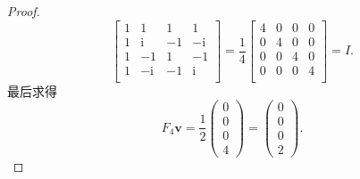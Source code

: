 \begin{proof}
\[\begin{bmatrix}
            1 & 1 & 1 & 1 \\
            1 & \mathrm{i} & -1 & -\mathrm{i} \\
            1 & -1 & 1 & -1 \\
            1 & -\mathrm{i} & -1 & \mathrm{i} \\
         \end{bmatrix} = \frac{1}{4} \begin{bmatrix}
            4 & 0 & 0 & 0 \\
            0 & 4 & 0 & 0 \\
            0 & 0 & 4 & 0 \\
            0 & 0 & 0 & 4 \\
         \end{bmatrix} = I.
    \]
    最后求得
    \[
        F_4\bm v
        =\frac12\begin{pmatrix}0\\0\\0\\4\end{pmatrix}
        =\boxed{\begin{pmatrix}0\\0\\0\\2\end{pmatrix}}.
    \]
\end{proof}
